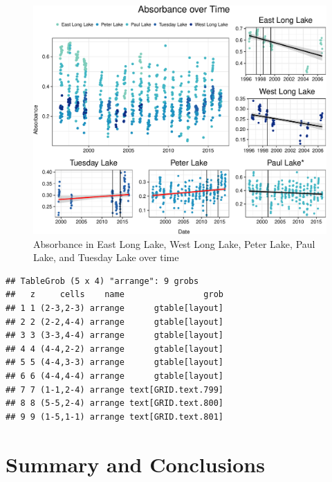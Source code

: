 \documentclass[12pt,]{article}
\begin{document}
\begin{figure}
\centering
\includegraphics{Bash_ENV872_Project_files/figure-latex/time-1.pdf}
\caption{\label{fig:time} Absorbance in East Long Lake, West Long Lake,
Peter Lake, Paul Lake, and Tuesday Lake over time}
\end{figure}

\begin{verbatim}
## TableGrob (5 x 4) "arrange": 9 grobs
##   z     cells    name                grob
## 1 1 (2-3,2-3) arrange      gtable[layout]
## 2 2 (2-2,4-4) arrange      gtable[layout]
## 3 3 (3-3,4-4) arrange      gtable[layout]
## 4 4 (4-4,2-2) arrange      gtable[layout]
## 5 5 (4-4,3-3) arrange      gtable[layout]
## 6 6 (4-4,4-4) arrange      gtable[layout]
## 7 7 (1-1,2-4) arrange text[GRID.text.799]
## 8 8 (5-5,2-4) arrange text[GRID.text.800]
## 9 9 (1-5,1-1) arrange text[GRID.text.801]
\end{verbatim}

\newpage

\section{Summary and Conclusions}\label{summary-and-conclusions}
\end{document}

